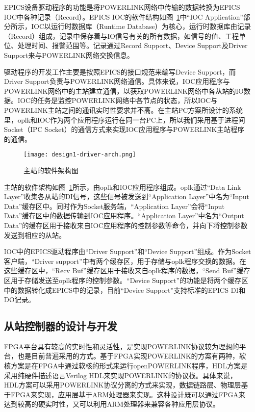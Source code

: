 EPICS设备驱动程序的功能是将POWERLINK网络中传输的数据转换为EPICS IOC中各种记录（Record）。EPICS IOC的软件结构如图~\ref{fig:design1-driver-arch}中“IOC Application”部分所示，IOC以运行时数据库（Runtime Database）为核心，运行时数据库由记录（Record）组成，记录中保存着与IO信号有关的所有数据，如信号的值、工程单位、处理时间、报警范围等。记录通过Record Support、Device Support及Driver Support来与POWERLINK网络交换信息。

驱动程序的开发工作主要是按照EPICS的接口规范来编写Device Support，而Driver Support负责与POWERLINK网络通信。具体来说，IOC应用程序与POWERLINK网络中的主站建立通信，以获取POWERLINK网络中各从站的IO数据。IOC的任务是监控POWERLINK网络中各节点的状态，所以IOC与POWERLINK主站之间的通讯实时性要求并不高。在主站PC方案所设计的系统里，oplk和IOC作为两个应用程序运行在同一台PC上，所以我们采用基于进程间Socket（IPC Socket）的通信方式来实现IOC应用程序与POWERLINK主站程序的通信。

\begin{figure}[!htb]
  \centering
  \texttt{[image: design1-driver-arch.png]}
  \caption{主站的软件架构图}
  \label{fig:design1-driver-arch}
\end{figure}

主站的软件架构如图~\ref{fig:design1-driver-arch}所示，由oplk和IOC应用程序组成。oplk通过“Data Link Layer”收集各从站的DI信号，这些信号被发送到“Application Layer”中名为“Input Data”缓存区中。同时作为Socket服务端，“Application Layer”会将“Input Data”缓存区中的数据传输到IOC应用程序。“Application Layer”中名为“Output Data”的缓存区用于接收来自IOC应用程序的控制参数等命令，并向下将控制参数发送到相应的从站。

IOC中的EPICS驱动程序由“Driver Support”和“Device Support”组成。作为Socket客户端，“Driver support”中有两个缓存区，用于存储与oplk程序交换的数据。在这些缓存区中，“Recv Buf”缓存区用于接收来自oplk程序的数据，“Send Buf”缓存区用于存储发送至oplk程序的控制参数。“Device Support”的功能是将两个缓存区中的数据转化成EPICS中的记录，目前“Device Support”支持标准的EPICS DI和DO记录。

\subsection{从站控制器的设计与开发}
\label{subsection:前端控制器的设计与开发}
FPGA平台具有较高的实时性和灵活性，是实现POWERLINK协议较为理想的平台，也是目前普遍采用的方式。基于FPGA实现POWERLINK的方案有两种，软核方案是在FPGA中通过软核的形式来运行openPOWERLINK程序，HDL方案是采用纯硬件描述语言Verilog HDL来实现POWERLINK的协议栈。具体来说，HDL方案可以采用POWERLINK协议分离的方式来实现，数据链路层、物理层基于FPGA来实现，应用层基于ARM处理器来实现。这种设计既可以通过FPGA来达到较高的硬实时性，又可以利用ARM处理器来兼容各种应用层协议。

